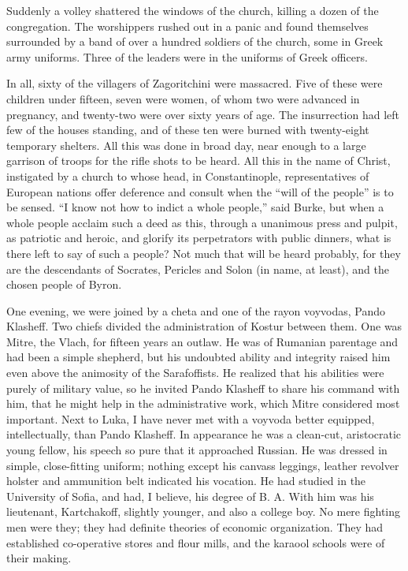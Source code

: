 \documentclass[a5paper,12pt]{book}
\begin{document}
Suddenly a volley shattered the windows of the church, killing a dozen of the congregation. The worshippers rushed out in a panic and found themselves surrounded by a band of over a hundred soldiers of the church, some in Greek army uniforms. Three of the leaders were in the uniforms of Greek officers.

In all, sixty of the villagers of Zagoritchini were massacred. Five of these were children under fifteen, seven were women, of whom two were advanced in pregnancy, and twenty-two were over sixty years of age. The insurrection had left few of the houses standing, and of these ten were burned with twenty-eight temporary shelters. All this was done in broad day, near enough to a large garrison of troops for the rifle shots to be heard. All this in the name of Christ, instigated by a church to whose head, in Constantinople, representatives of European nations offer deference and consult when the “will of the people” is to be sensed. “I know not how to indict a whole people,” said Burke, but when a whole people acclaim such a deed as this, through a unanimous press and pulpit, as patriotic and heroic, and glorify its perpetrators with public dinners, what is there left to say of such a people? Not much that will be heard probably, for they are the descendants of Socrates, Pericles and Solon (in name, at least), and the chosen people of Byron.

One evening, we were joined by a cheta and one of the rayon voyvodas, Pando Klasheff. Two chiefs divided the administration of Kostur between them. One was Mitre, the Vlach, for fifteen years an outlaw. He was of Rumanian parentage and had been a simple shepherd, but his undoubted ability and integrity raised him even above the animosity of the Sarafoffists. He realized that his abilities were purely of military value, so he invited Pando Klasheff to share his command with him, that he might help in the administrative work, which Mitre considered most important.
Next to Luka, I have never met with a voyvoda better equipped, intellectually, than Pando Klasheff. In appearance he was a clean-cut, aristocratic young fellow, his speech so pure that it approached Russian. He was dressed in simple, close-fitting uniform; nothing except his canvass leggings, leather revolver holster and ammunition belt indicated his vocation. He had studied in the University of Sofia, and had, I believe, his degree of B. A. With him was his lieutenant, Kartchakoff, slightly younger, and also a college boy. No mere fighting men were they; they had definite theories of economic organization. They had established co-operative stores and flour mills, and the karaool schools were of their making. 
\end{document}
